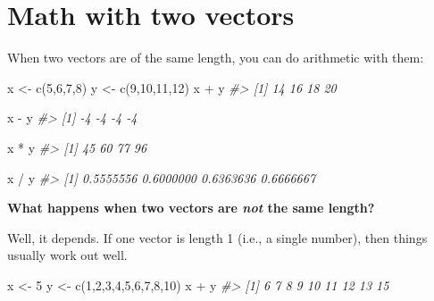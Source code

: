 \documentclass[
]{book}
\newenvironment{Shaded}{\begin{snugshade}}{\end{snugshade}}
\newcommand{\CommentTok}[1]{\textcolor[rgb]{0.56,0.35,0.01}{\textit{#1}}}
\newcommand{\DecValTok}[1]{\textcolor[rgb]{0.00,0.00,0.81}{#1}}
\newcommand{\FunctionTok}[1]{\textcolor[rgb]{0.00,0.00,0.00}{#1}}
\newcommand{\NormalTok}[1]{#1}
\newcommand{\OtherTok}[1]{\textcolor[rgb]{0.56,0.35,0.01}{#1}}
\newcommand{\SpecialCharTok}[1]{\textcolor[rgb]{0.00,0.00,0.00}{#1}}
\begin{document}
\hypertarget{math-with-two-vectors}{%
\section*{Math with two vectors}\label{math-with-two-vectors}}

When two vectors are of the same length, you can do arithmetic with them:

\begin{Shaded}
\begin{Highlighting}[]
\NormalTok{x }\OtherTok{\textless{}{-}} \FunctionTok{c}\NormalTok{(}\DecValTok{5}\NormalTok{,}\DecValTok{6}\NormalTok{,}\DecValTok{7}\NormalTok{,}\DecValTok{8}\NormalTok{)}
\NormalTok{y }\OtherTok{\textless{}{-}} \FunctionTok{c}\NormalTok{(}\DecValTok{9}\NormalTok{,}\DecValTok{10}\NormalTok{,}\DecValTok{11}\NormalTok{,}\DecValTok{12}\NormalTok{)}
\NormalTok{x }\SpecialCharTok{+}\NormalTok{ y}
\CommentTok{\#\textgreater{} [1] 14 16 18 20}
\end{Highlighting}
\end{Shaded}

\begin{Shaded}
\begin{Highlighting}[]
\NormalTok{x }\SpecialCharTok{{-}}\NormalTok{ y}
\CommentTok{\#\textgreater{} [1] {-}4 {-}4 {-}4 {-}4}
\end{Highlighting}
\end{Shaded}

\begin{Shaded}
\begin{Highlighting}[]
\NormalTok{x }\SpecialCharTok{*}\NormalTok{ y}
\CommentTok{\#\textgreater{} [1] 45 60 77 96}
\end{Highlighting}
\end{Shaded}

\begin{Shaded}
\begin{Highlighting}[]
\NormalTok{x }\SpecialCharTok{/}\NormalTok{ y}
\CommentTok{\#\textgreater{} [1] 0.5555556 0.6000000 0.6363636 0.6666667}
\end{Highlighting}
\end{Shaded}

\textbf{What happens when two vectors are \emph{not} the same length?}

Well, it depends. If one vector is length 1 (i.e., a single number), then things usually work out well.

\begin{Shaded}
\begin{Highlighting}[]
\NormalTok{x }\OtherTok{\textless{}{-}} \DecValTok{5}
\NormalTok{y }\OtherTok{\textless{}{-}} \FunctionTok{c}\NormalTok{(}\DecValTok{1}\NormalTok{,}\DecValTok{2}\NormalTok{,}\DecValTok{3}\NormalTok{,}\DecValTok{4}\NormalTok{,}\DecValTok{5}\NormalTok{,}\DecValTok{6}\NormalTok{,}\DecValTok{7}\NormalTok{,}\DecValTok{8}\NormalTok{,}\DecValTok{10}\NormalTok{)}
\NormalTok{x }\SpecialCharTok{+}\NormalTok{ y}
\CommentTok{\#\textgreater{} [1]  6  7  8  9 10 11 12 13 15}
\end{Highlighting}
\end{Shaded}
\end{document}
